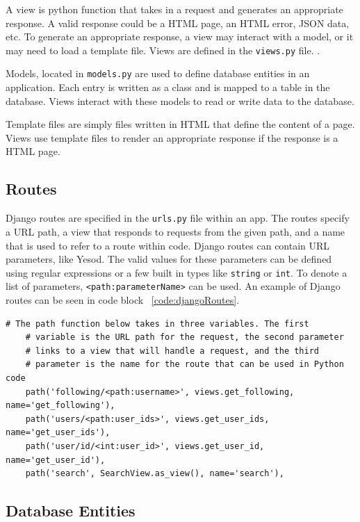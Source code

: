 A view is python function that takes in a request and generates an appropriate
response. A valid response could be a HTML page, an HTML error, JSON data, etc.
To generate an appropriate response, a view may interact with a model, or it
may need to load a template file. Views are defined in the \texttt{views.py}
file. \parencite{djangoViews}.

Models, located in \texttt{models.py} are used to define database entities
in an application. Each entry is written as a class and is mapped to a table
in the database. Views interact with these models to read or write data
to the database.

Template files are simply files written in HTML that define the content
of a page. Views use template files to render an appropriate response if
the response is a HTML page.

\subsection{Routes}

Django routes are specified in the \texttt{urls.py} file within an app. The routes
specify a URL path, a view that responds to requests from the given path, and a name
that is used to refer to a route within code. Django routes can contain URL parameters,
like Yesod. The valid values for these parameters can be defined using regular expressions
or a few built in types like \texttt{string} or \texttt{int}. To denote a list of parameters,
\texttt{<path:parameterName>} can be used. An example of Django routes can be seen in code block ~\ref{code:djangoRoutes}.


\begin{lstlisting}[caption={An extract of Django routes},label={code:djangoRoutes}]
	# The path function below takes in three variables. The first
	# variable is the URL path for the request, the second parameter
	# links to a view that will handle a request, and the third
	# parameter is the name for the route that can be used in Python code
	path('following/<path:username>', views.get_following, name='get_following'),
	path('users/<path:user_ids>', views.get_user_ids, name='get_user_ids'),
	path('user/id/<int:user_id>', views.get_user_id, name='get_user_id'),
	path('search', SearchView.as_view(), name='search'),
\end{lstlisting}

\subsection{Database Entities}


